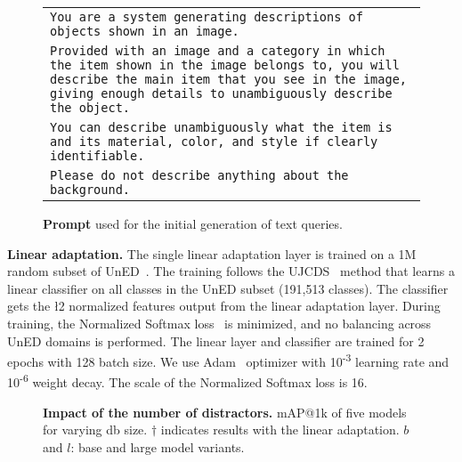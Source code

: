 \begin{figure}[t]
    \centering
    \begin{tcolorbox}[colback=gray!15, colframe=black, width=\linewidth]
        \hspace{-8pt}
        \begin{tabular}{p{1.03\linewidth}}
            {\scriptsize \texttt{You are a system generating descriptions of objects shown in an image.}} \\
            {\scriptsize \texttt{Provided with an image and a category in which the item shown in the image belongs to, you will describe the main item that you see in the image, giving enough details to unambiguously describe the object.}} \\
            {\scriptsize \texttt{You can describe unambiguously what the item is and its material, color, and style if clearly identifiable.}} \\
            {\scriptsize \texttt{Please do not describe anything about the background.}}
        \end{tabular}
    \end{tcolorbox}
    \vspace{-10pt}
    \caption{\textbf{Prompt} used for the initial generation of text queries.
    \label{fig:chagpt_prompt}
    \vspace{-6pt}
    }
\end{figure}

\noindent\textbf{Linear adaptation.}
The single linear adaptation layer is trained on a 1M random subset of UnED~\cite{ycc+23}.
The training follows the UJCDS~\cite{ycc+23} method that learns a linear classifier on all classes in the UnED subset (191,513 classes). The classifier gets the \l2 normalized features output from the linear adaptation layer.
During training, the Normalized Softmax loss~\cite{zw18} is minimized, and no balancing across UnED domains is performed.
The linear layer and classifier are trained for 2 epochs with 128 batch size. We use Adam~\cite{kb15} optimizer with 10\textsuperscript{-3} learning rate and 10\textsuperscript{-6} weight decay. The scale of the Normalized Softmax loss is 16.

\begin{figure}[t]
    \centering
    
    \vspace{-10pt}
    \caption{\textbf{Impact of the number of distractors.} mAP@1k of five models for varying db size. $\dagger$ indicates results with the linear adaptation. $b$ and $l$: base and large model variants.
    \label{fig:number_of_distractors}
    \vspace{-13pt}
    }
\end{figure}

